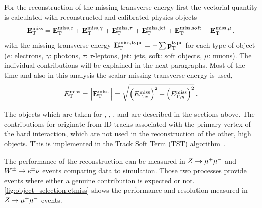 For the reconstruction of the missing transverse energy first the vectorial quantity \etmissvec{} is calculated
with reconstructed and calibrated physics objects~\cite{ATL-PHYS-PUB-2015-023}
\begin{equation}
    \label{eq:met:vector}
    \mathbf{E}_\text{T}^\text{miss} = \mathbf{E}_\text{T}^{\text{miss},e} + \mathbf{E}_\text{T}^{\text{miss},\gamma} + \mathbf{E}_\text{T}^{\text{miss},\tau} + \mathbf{E}_\text{T}^{\text{miss},\text{jet}} + \mathbf{E}_\text{T}^{\text{miss},\text{soft}} + \mathbf{E}_\text{T}^{\text{miss},\mu} \,,
\end{equation}
with the missing transverse energy $\mathbf{E}_\text{T}^{\text{miss},\text{type}} = - \sum \mathbf{p}_\text{T}^\text{type}$ for each type of object
($e$: electrons, $\gamma$: photons, $\tau$: $\tau$-leptons, jet: jets, soft: soft objects, $\mu$: muons).
The individual contributions will be explained in the next paragraphs.
Most of the time and also in this analysis the scalar missing transverse energy \etmiss{} is used,
\begin{equation}
    \label{eq:met:scalar}
    E_\text{T}^\text{miss}{} = \norm{\mathbf{E}_\text{T}^\text{miss}{}} = \sqrt{{\left(E_{\text{T},x}^\text{miss}\right)}^2 + {\left(E_{\text{T},y}^\text{miss}\right)}^2} \,.
\end{equation}

The objects which are taken for , \etmissvecobj{\mu}, \etmissvecobj{\tau},
and  are described in the sections above.
The contributions for  originate from  ID tracks associated with the primary vertex of the
hard interaction, which are not used in the reconstruction of the other, high \pt{} objects.
This is implemented in the Track Soft Term (TST) algorithm~\cite{ATL-PHYS-PUB-2015-023}.

The performance of the \etmiss{} reconstruction can be measured in $Z \to \mu^+\mu^-$ and $W^\pm \to e^\pm \nu$
events comparing data to simulation. Those two processes provide events where either a genuine \etmiss{} contribution
is expected or not.
\cref{fig:object_selection:etmiss} shows the performance and resolution measured in $Z \to \mu^+\mu^-$ events.

